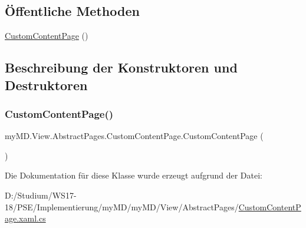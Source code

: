\subsection*{Öffentliche Methoden}
\begin{DoxyCompactItemize}
\item 
\mbox{\hyperlink{classmy_m_d_1_1_view_1_1_abstract_pages_1_1_custom_content_page_a3cb9c69e49e16c30e2e5377790702769}{Custom\+Content\+Page}} ()
\end{DoxyCompactItemize}


\subsection{Beschreibung der Konstruktoren und Destruktoren}
\mbox{\label{classmy_m_d_1_1_view_1_1_abstract_pages_1_1_custom_content_page_a3cb9c69e49e16c30e2e5377790702769}} 
\subsubsection{\texorpdfstring{Custom\+Content\+Page()}{CustomContentPage()}}
{\footnotesize\ttfamily my\+M\+D.\+View.\+Abstract\+Pages.\+Custom\+Content\+Page.\+Custom\+Content\+Page (\begin{DoxyParamCaption}{ }\end{DoxyParamCaption})}



Die Dokumentation für diese Klasse wurde erzeugt aufgrund der Datei\+:\begin{DoxyCompactItemize}
\item 
D\+:/\+Studium/\+W\+S17-\/18/\+P\+S\+E/\+Implementierung/my\+M\+D/my\+M\+D/\+View/\+Abstract\+Pages/\mbox{\hyperlink{_custom_content_page_8xaml_8cs}{Custom\+Content\+Page.\+xaml.\+cs}}\end{DoxyCompactItemize}
